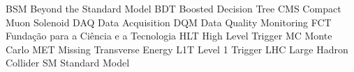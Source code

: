 
 {BSM} {Beyond the Standard Model}
 {BDT} {Boosted Decision Tree}
 {CMS} {Compact Muon Solenoid}
 {DAQ} {Data Acquisition}
 {DQM} {Data Quality Monitoring}
 {FCT} {Fundação para a Ciência e a Tecnologia}
 {HLT} {High Level Trigger}
  {MC}  {Monte Carlo}
 {MET} {Missing Transverse Energy}
 {L1T} {Level 1 Trigger}
 {LHC} {Large Hadron Collider}
  {SM}  {Standard Model}


